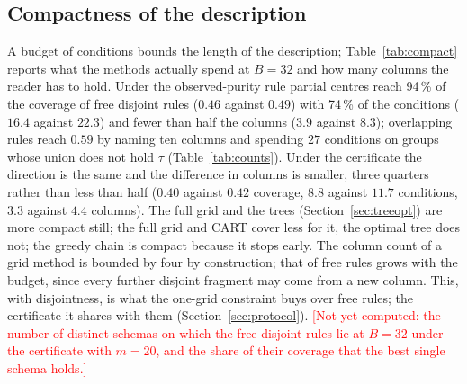 \documentclass[11pt]{article}
\newcommand{\todo}[1]{\textcolor{red}{[#1]}}
\begin{document}
\subsection{Compactness of the description}\label{sec:compact}
\begin{table}[t]\centering\small
\caption{Compactness at $B=32$ over the informative configurations on which every method ran (\texttt{experiments/compactness.py}). Coverage and conditions spent are held-out means over all splits; groups and distinct columns named by the description are counted on the first split, since the column set is not recorded per split. The tree and SSD++ record no column labels.}\label{tab:compact}

\end{table}

A budget of conditions bounds the length of the description; Table~\ref{tab:compact} reports what the methods actually spend at $B=32$ and how many columns the reader has to hold. Under the observed-purity rule partial centres reach 94\,\% of the coverage of free disjoint rules ($0.46$ against $0.49$) with 74\,\% of the conditions ($16.4$ against $22.3$) and fewer than half the columns ($3.9$ against $8.3$); overlapping rules reach $0.59$ by naming ten columns and spending $27$ conditions on groups whose union does not hold $\tau$ (Table~\ref{tab:counts}). Under the certificate the direction is the same and the difference in columns is smaller, three quarters rather than less than half ($0.40$ against $0.42$ coverage, $8.8$ against $11.7$ conditions, $3.3$ against $4.4$ columns). The full grid and the trees (Section~\ref{sec:treeopt}) are more compact still; the full grid and CART cover less for it, the optimal tree does not; the greedy chain is compact because it stops early. The column count of a grid method is bounded by four by construction; that of free rules grows with the budget, since every further disjoint fragment may come from a new column. This, with disjointness, is what the one-grid constraint buys over free rules; the certificate it shares with them (Section~\ref{sec:protocol}). \todo{Not yet computed: the number of distinct schemas on which the free disjoint rules lie at $B=32$ under the certificate with $m=20$, and the share of their coverage that the best single schema holds.}
\end{document}
